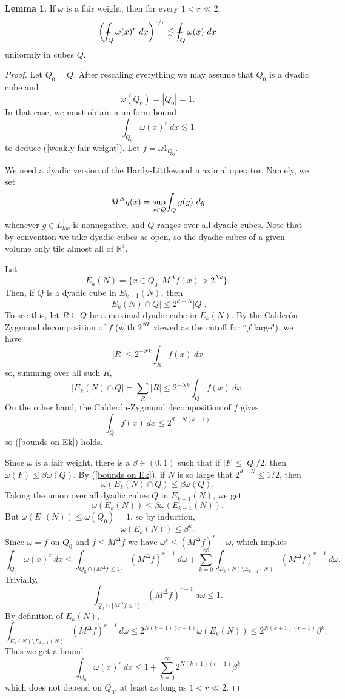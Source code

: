 \documentclass[12pt]{book}
\newcommand{\RR}{\mathbb{R}}
\def\Xint#1{\mathchoice
{\XXint\displaystyle\textstyle{#1}}%
{\XXint\textstyle\scriptstyle{#1}}%
{\XXint\scriptstyle\scriptscriptstyle{#1}}%
{\XXint\scriptscriptstyle\scriptscriptstyle{#1}}%
\!\int}
\def\XXint#1#2#3{{\setbox0=\hbox{$#1{#2#3}{\int}$ }
\vcenter{\hbox{$#2#3$ }}\kern-.6\wd0}}
\def\dashint{\Xint-}
\theoremstyle{definition}
\newtheorem{lemma}[theorem]{Lemma}
\begin{document}
\begin{lemma}
If $\omega$ is a fair weight, then for every $1 < r \ll 2$,
\begin{equation}
\label{weakly fair weight}
\left(\dashint_Q \omega(x)^r ~dx\right)^{1/r} \lesssim \dashint_Q \omega(x) ~dx
\end{equation}
uniformly in cubes $Q$.
\end{lemma}
\begin{proof}
Let $Q_0 = Q$. After rescaling everything we may assume that $Q_0$ is a dyadic cube and
$$\omega(Q_0) = |Q_0| = 1.$$
In that case, we must obtain a uniform bound
\begin{equation}
\label{normalized weakly fair weight}
\int_{Q_0} \omega(x)^r ~dx \lesssim 1
\end{equation}
to deduce (\ref{weakly fair weight}).
Let $f = \omega 1_{Q_0}$.

We need a dyadic version of the Hardy-Littlewood maximal operator. Namely, we set
$$M^\Delta g(x) = \sup_{x \in Q} \dashint_Q g(y) ~dy$$
whenever $g \in L^1_{loc}$ is nonnegative, and $Q$ ranges over all dyadic cubes.
Note that by convention we take dyadic cubes as open, so the dyadic cubes of a given volume only tile almost all of $\RR^d$.

Let
$$E_k(N) = \{x \in Q_0: M^\Delta f(x) > 2^{Nk}\}.$$
Then, if $Q$ is a dyadic cube in $E_{k-1}(N)$, then
\begin{equation}
\label{bounds on Ek}
|E_k(N) \cap Q| \leq 2^{d - N} |Q|.
\end{equation}
To see this, let $R \subseteq Q$ be a maximal dyadic cube in $E_k(N)$. By the Calder\'on-Zygmund decomposition of $f$ (with $2^{Nk}$ viewed as the cutoff for ``$f$ large"), we have
$$|R| \leq 2^{-Nk} \int_R f(x) ~dx$$
so, summing over all such $R$,
$$|E_k(N) \cap Q| = \sum_R |R| \leq 2^{-Nk} \int_Q f(x) ~dx.$$
On the other hand, the Calder\'on-Zygmund decomposition of $f$ gives
$$\int_Q f(x) ~dx \leq 2^{d + N(k - 1)}$$
so (\ref{bounds on Ek}) holds.

Since $\omega$ is a fair weight, there is a $\beta \in (0, 1)$ such that if $|F| \leq |Q|/2$, then $\omega(F) \leq \beta \omega(Q)$.
By (\ref{bounds on Ek}), if $N$ is so large that $2^{d - N} \leq 1/2$, then
$$\omega(E_k(N) \cap Q) \leq \beta \omega(Q).$$
Taking the union over all dyadic cubes $Q$ in $E_{k-1}(N)$, we get
$$\omega(E_k(N)) \leq \beta \omega(E_{k-1}(N)).$$
But $\omega(E_1(N)) \leq \omega(Q_0) = 1$, so by induction,
$$\omega(E_k(N)) \leq \beta^k.$$
Since $\omega = f$ on $Q_0$ and $f \leq M^\Delta f$ we have $\omega^r \leq (M^\Delta f)^{r - 1}\omega$, which implies
$$\int_{Q_0} \omega(x)^r ~dx \leq \int_{Q_0 \cap \{M^\Delta f \leq 1\}} (M^\Delta f)^{r - 1} ~d\omega + \sum_{k=0}^\infty \int_{E_k(N) \setminus E_{k-1}(N)} (M^\Delta f)^{r - 1} ~d\omega.$$
Trivially,
$$\int_{Q_0 \cap \{M^\Delta f \leq 1\}} (M^\Delta f)^{r - 1} ~d\omega \leq 1.$$
By definition of $E_k(N)$,
$$\int_{E_k(N) \setminus E_{k-1}(N)} (M^\Delta f)^{r - 1} ~d\omega \leq 2^{N(k+1)(r - 1)} \omega(E_k(N)) \leq 2^{N(k+1)(r - 1)} \beta^k.$$
Thus we get a bound
$$\int_{Q_0} \omega(x)^r ~dx \leq 1 + \sum_{k=0}^\infty 2^{N(k+1)(r-1)} \beta^k$$
which does not depend on $Q_0$, at least as long as $1 < r \ll 2$.
\end{proof}
\end{document}
